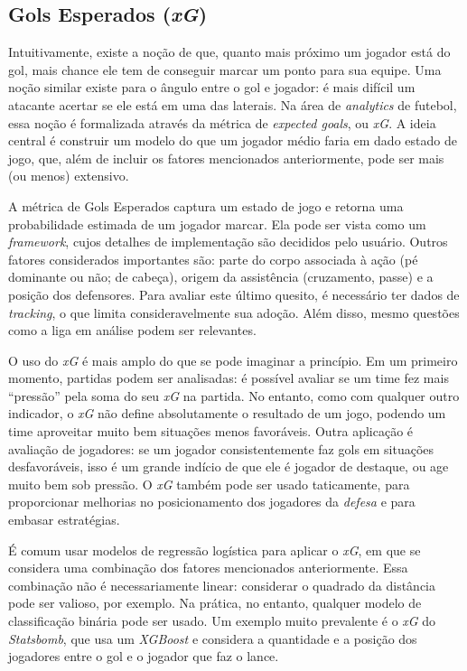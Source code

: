 \documentclass{article}
\begin{document}
\subsection{Gols Esperados (\textit{xG})}

Intuitivamente, existe a noção de que, quanto mais próximo um jogador está do
gol, mais chance ele tem de conseguir marcar um ponto para sua equipe. Uma
noção similar existe para o ângulo entre o gol e jogador: é mais difícil um
atacante acertar se ele está em uma das laterais. Na área de \textit{analytics}
de futebol, essa noção é formalizada através da métrica de \textit{expected
goals}, ou \textit{xG}. A ideia central é construir um modelo do que um jogador
médio faria em dado estado de jogo, que, além de incluir os fatores mencionados
anteriormente, pode ser mais (ou menos) extensivo.

A métrica de Gols Esperados captura um estado de jogo e retorna uma
probabilidade estimada de um jogador marcar. Ela pode ser vista como um
\textit{framework}, cujos detalhes de implementação são decididos pelo usuário.
Outros fatores considerados importantes são: parte do corpo associada à ação
(pé dominante ou não; de cabeça), origem da assistência (cruzamento, passe) e a
posição dos defensores. Para avaliar este último quesito, é necessário ter
dados de \textit{tracking}, o que limita consideravelmente sua adoção. Além disso,
mesmo questões como a liga em análise podem ser relevantes.

O uso do \textit{xG} é mais amplo do que se pode imaginar a princípio. Em um
primeiro momento, partidas podem ser analisadas: é possível avaliar se um time
fez mais ``pressão'' pela soma do seu \textit{xG} na partida. No entanto, como
com qualquer outro indicador, o \textit{xG} não define absolutamente o
resultado de um jogo, podendo um time aproveitar muito bem situações menos
favoráveis. Outra aplicação é avaliação de jogadores: se um jogador
consistentemente faz gols em situações desfavoráveis, isso é um grande indício
de que ele é jogador de destaque, ou age muito bem sob pressão. O \textit{xG}
também pode ser usado taticamente, para proporcionar melhorias no
posicionamento dos jogadores da \textit{defesa} e para embasar estratégias.

É comum usar modelos de regressão logística para aplicar o \textit{xG}, em que
se considera uma combinação dos fatores mencionados anteriormente. Essa
combinação não é necessariamente linear: considerar o quadrado da distância
pode ser valioso, por exemplo. Na prática, no entanto, qualquer modelo de
classificação binária pode ser usado. Um exemplo muito prevalente é o
\textit{xG} do \textit{Statsbomb}, que usa um \textit{XGBoost} e considera a
quantidade e a posição dos jogadores entre o gol e o jogador que faz o lance.
\end{document}
